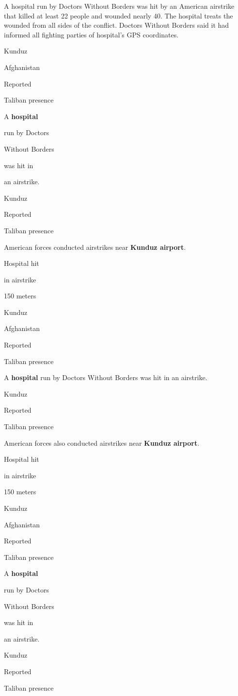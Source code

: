 A hospital run by Doctors Without Borders was hit by an American
airstrike that killed at least 22 people and wounded nearly 40. The
hospital treats the wounded from all sides of the conflict. Doctors
Without Borders said it had informed all fighting parties of hospital's
GPS coordinates.

Kunduz

Afghanistan

Reported

Taliban presence

A \textbf{hospital}

run by Doctors

Without Borders

was hit in

an airstrike.

Kunduz

Reported

Taliban presence

American forces conducted airstrikes near \textbf{Kunduz airport}.

Hospital hit

in airstrike

150 meters

Kunduz

Afghanistan

Reported

Taliban presence

A \textbf{hospital} run by Doctors Without Borders was hit in an
airstrike.

Kunduz

Reported

Taliban presence

American forces also conducted airstrikes near \textbf{Kunduz airport}.

Hospital hit

in airstrike

150 meters

Kunduz

Afghanistan

Reported

Taliban presence

A \textbf{hospital}

run by Doctors

Without Borders

was hit in

an airstrike.

Kunduz

Reported

Taliban presence

